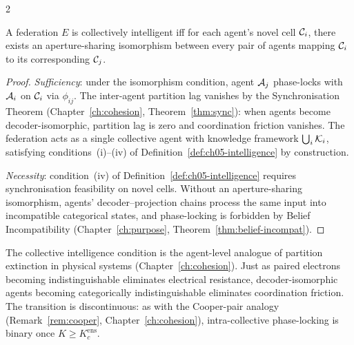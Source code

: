 \begin{multicols}{2}
\begin{theorem}\label{thm:ch05-t5}
A federation $E$ is collectively intelligent iff for each agent's novel cell $\mathcal{C}_i$,
there exists an aperture-sharing isomorphism between every pair of agents mapping
$\mathcal{C}_i$ to its corresponding $\mathcal{C}_j$.
\end{theorem}

\begin{proof}
\emph{Sufficiency}: under the isomorphism condition, agent $\mathcal{A}_j$ phase-locks with
$\mathcal{A}_i$ on $\mathcal{C}_i$ via $\phi_{ij}$. The inter-agent partition lag vanishes by the
Synchronisation Theorem (Chapter~\ref{ch:cohesion}, Theorem~\ref{thm:sync}): when
agents become decoder-isomorphic, partition lag is zero and coordination friction
vanishes. The federation acts as a single collective agent with knowledge framework
$\bigcup_i \mathcal{K}_i$, satisfying conditions~(i)--(iv) of
Definition~\ref{def:ch05-intelligence} by construction.

\emph{Necessity}: condition~(iv) of Definition~\ref{def:ch05-intelligence} requires
synchronisation feasibility on novel cells. Without an aperture-sharing isomorphism,
agents' decoder--projection chains process the same input into incompatible categorical
states, and phase-locking is forbidden by Belief Incompatibility
(Chapter~\ref{ch:purpose}, Theorem~\ref{thm:belief-incompat}).
\end{proof}

\begin{remark}
\label{rem:ch05-coll-pe}
The collective intelligence condition is the agent-level analogue of partition extinction
in physical systems (Chapter~\ref{ch:cohesion}). Just as paired electrons becoming
indistinguishable eliminates electrical resistance, decoder-isomorphic agents becoming
categorically indistinguishable eliminates coordination friction. The transition is
discontinuous: as with the Cooper-pair analogy (Remark~\ref{rem:cooper},
Chapter~\ref{ch:cohesion}), intra-collective phase-locking is binary once
$K \ge K_c^{\mathrm{ens}}$.
\end{remark}

\end{multicols}

